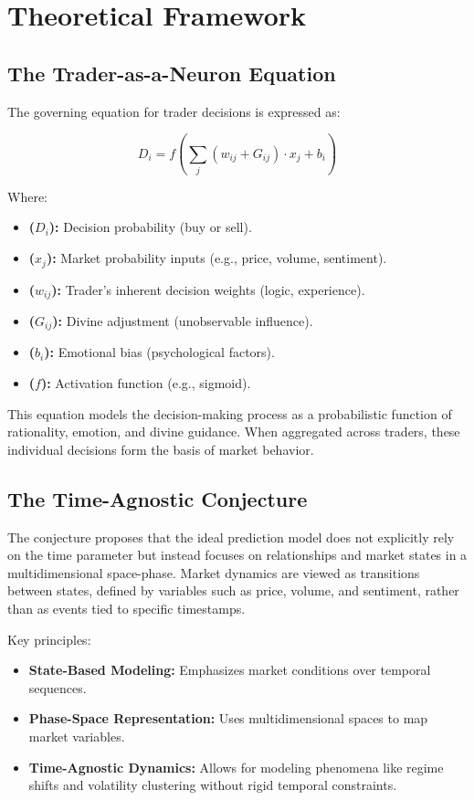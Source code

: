 \documentclass[a4]{article}
\newcommand{\bn}{\bigskip\noindent}
\begin{document}
\section{Theoretical Framework}

\subsection{The Trader-as-a-Neuron Equation}

The governing equation for trader decisions is expressed as:

$$
D_i = f\left(\sum_{j} (w_{ij} + G_{ij}) \cdot x_j + b_i\right)
$$

Where:

\begin{itemize}
\item  {\bf ($D_i$):} Decision probability (buy or sell).  
\item  {\bf ($x_j$):} Market probability inputs (e.g., price, volume, sentiment).  
\item {\bf ($w_{ij}$):} Trader's inherent decision weights (logic, experience).  
\item  {\bf ($G_{ij}$):} Divine adjustment (unobservable influence).  
\item {\bf ($b_i$):} Emotional bias (psychological factors).  
\item {\bf ($f$):} Activation function (e.g., sigmoid).
\end{itemize}

This equation models the decision-making process as a probabilistic function of rationality, emotion, and divine guidance. When aggregated across traders, these individual decisions form the basis of market behavior.

\subsection{The Time-Agnostic Conjecture}

The conjecture proposes that the ideal prediction model does not explicitly rely on the time parameter but instead focuses on relationships and market states in a multidimensional space-phase. Market dynamics are viewed as transitions between states, defined by variables such as price, volume, and sentiment, rather than as events tied to specific timestamps.

\bn
Key principles:

\begin{itemize}
\item   {\bf State-Based Modeling:} Emphasizes market conditions over temporal sequences.
\item {\bf Phase-Space Representation:} Uses multidimensional spaces to map market variables.
\item {\bf Time-Agnostic Dynamics:} Allows for modeling phenomena like regime shifts and volatility clustering without rigid temporal constraints.
\end{itemize}
\end{document}

